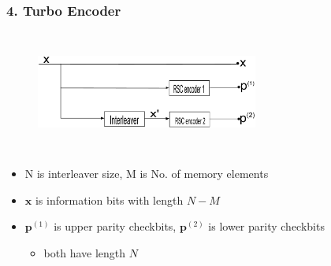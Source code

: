 \documentclass{beamer}  %
\newcommand\blfootnote[1]{%
  \begingroup
  \renewcommand\thefootnote{}\footnote{#1}%
  \addtocounter{footnote}{-1}%
  \endgroup
}
\begin{document}
\begin{frame}
\frametitle{4. Turbo Encoder}

\begin{figure}
\centering
		\includegraphics[height = 4cm, width=0.65\textwidth]{TurboEncoder.eps}
	\end{figure}


\begin{itemize}
\item N is interleaver size, M is No. of memory elements
\item $\mathbf{x}$ is information bits with length $N-M$
\item $\mathbf{p}^{(1)}$ is upper parity checkbits, $\mathbf{p}^{(2)}$ is lower parity checkbits 

\begin{itemize}
\item both have length $N$
\end{itemize}

\end{itemize}

\end{frame}
\end{document}
